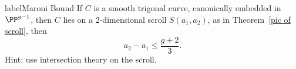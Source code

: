 \begin{exercise}label{Maroni Bound}
If $C$ is a smooth trigonal curve, canonically embedded in $\PP^{g-1}$,
then $C$ lies on a 2-dimensional scroll $S(a_1, a_2)$, as in Theorem~\ref{pic of scroll},
then 
$$
a_2-a_1\leq \frac{g+2}{3}.
$$
Hint: use intersection theory on the scroll.
\end{exercise}

%





